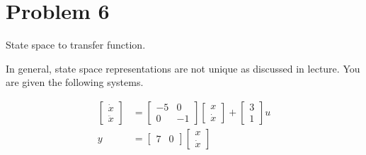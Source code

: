 \section{Problem 6}
State space to transfer function.

In general, state space representations are not unique as discussed in lecture. You are given the following systems.

\begin{equation}
    \begin{aligned}
        \begin{bmatrix}
            \dot{x} \\
            \ddot{x}
        \end{bmatrix} &=
        \begin{bmatrix}
            -5 & 0 \\
            0  & -1
        \end{bmatrix}
        \begin{bmatrix}
            x \\
            \dot{x}
        \end{bmatrix} + 
        \begin{bmatrix}
            3\\
            1
        \end{bmatrix}
        u
        \\
        y &=
        \begin{bmatrix}
            7 & 0
        \end{bmatrix}
        \begin{bmatrix}
            x \\
            \dot{x}
        \end{bmatrix}
    \end{aligned}
\end{equation}
\pagebreak